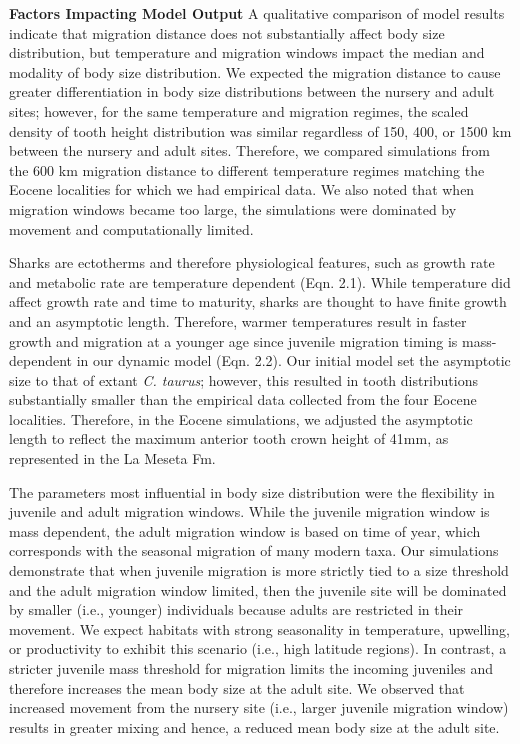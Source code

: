\documentclass[]{rsos}%
\begin{document}
\textbf{Factors Impacting Model Output}
A qualitative comparison of model results indicate that migration distance does not substantially affect body size distribution, but temperature and migration windows impact the median and modality of body size distribution. 
We expected the migration distance to cause greater differentiation in body size distributions between the nursery and adult sites; however, for the same temperature and migration regimes, the scaled density of tooth height distribution was similar regardless of 150, 400, or 1500 km between the nursery and adult sites. 
Therefore, we compared simulations from the 600 km migration distance to different temperature regimes matching the Eocene localities for which we had empirical data. 
We also noted that when migration windows became too large, the simulations were dominated by movement and computationally limited.

Sharks are ectotherms and therefore physiological features, such as growth rate and metabolic rate are temperature dependent (Eqn. 2.1). 
While temperature did affect growth rate and time to maturity, sharks are thought to have finite growth and an asymptotic length. 
Therefore, warmer temperatures result in faster growth and migration at a younger age since juvenile migration timing is mass-dependent in our dynamic model (Eqn. 2.2). 
Our initial model set the asymptotic size to that of extant \emph{C. taurus}; however, this resulted in tooth distributions substantially smaller than the empirical data collected from the four Eocene localities.
Therefore, in the Eocene simulations, we adjusted the asymptotic length to reflect the maximum anterior tooth crown height of 41mm, as represented in the La Meseta Fm. 

The parameters most influential in body size distribution were the flexibility in juvenile and adult migration windows. 
While the juvenile migration window is mass dependent, the adult migration window is based on time of year, which corresponds with the seasonal migration of many modern taxa.
Our simulations demonstrate that when juvenile migration is more strictly tied to a size threshold and the adult migration window limited, then the juvenile site will be dominated by smaller (i.e., younger) individuals because adults are restricted in their movement.
We expect habitats with strong seasonality in temperature, upwelling, or productivity to exhibit this scenario (i.e., high latitude regions).
In contrast, a stricter juvenile mass threshold for migration limits the incoming juveniles and therefore increases the mean body size at the adult site. 
We observed that increased movement from the nursery site (i.e., larger juvenile migration window) results in greater mixing and hence, a reduced mean body size at the adult site.
\end{document}
